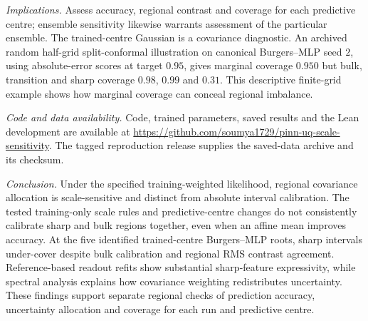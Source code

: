 \emph{Implications.}
Assess accuracy, regional contrast and coverage for each predictive centre;
ensemble sensitivity likewise warrants assessment of the particular ensemble.
The trained-centre Gaussian is a covariance diagnostic.
An archived random half-grid split-conformal illustration \citep{lei2018conformal} on canonical Burgers--MLP seed $2$,
using absolute-error scores at target $0.95$, gives marginal coverage $0.950$ but
bulk, transition and sharp coverage $0.98$, $0.99$ and $0.31$. This descriptive
finite-grid example shows how marginal coverage can conceal regional imbalance.

\emph{Code and data availability.}
Code, trained parameters, saved results and the Lean development are available at
\url{https://github.com/soumya1729/pinn-uq-scale-sensitivity}.
The tagged reproduction release supplies the saved-data archive and its checksum.

\emph{Conclusion.}
Under the specified training-weighted likelihood, regional covariance allocation
is scale-sensitive and distinct from absolute interval calibration. The tested
training-only scale rules and predictive-centre changes do not consistently
calibrate sharp and bulk regions together, even when an affine mean improves
accuracy. At the five identified trained-centre Burgers--MLP roots, sharp
intervals under-cover despite bulk calibration and regional RMS contrast
agreement. Reference-based readout refits show substantial sharp-feature
expressivity, while spectral analysis explains how covariance weighting
redistributes uncertainty. These findings support separate regional checks of
prediction accuracy, uncertainty allocation and coverage for each run and
predictive centre.
